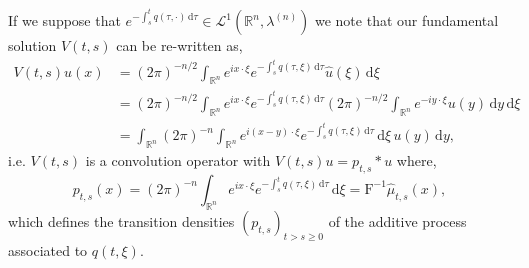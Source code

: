 \documentclass[a4paper, 12pt]{report}
\theoremstyle{remark}
\theoremstyle{definition}
\begin{document}
If we suppose that $e^{-\int_s^tq(\tau, \cdot)\,\mathrm{d}\tau} \in \mathcal{L}^1(\mathbb{R}^n, \lambda^{(n)})$ we note that our fundamental solution $V(t, s)$ can be re-written as,
\begin{align}
V(t, s)u(x) & = (2\pi)^{-n/2}\int_{\mathbb{R}^n}e^{ix\cdot\xi}e^{-\int_s^tq(\tau, \xi)\,\mathrm{d}\tau}\hat{u}(\xi)\,\mathrm{d}\xi\nonumber\\
& = (2\pi)^{-n/2}\int_{\mathbb{R}^n}e^{ix\cdot\xi}e^{-\int_s^tq(\tau, \xi)\,\mathrm{d}\tau}(2\pi)^{-n/2}\int_{\mathbb{R}^n}e^{-iy\cdot\xi}u(y)\,\mathrm{d}y\,\mathrm{d}\xi\nonumber\\
& = \int_{\mathbb{R}^n}(2\pi)^{-n}\int_{\mathbb{R}^n}e^{i(x - y)\cdot\xi}e^{-\int_s^tq(\tau, \xi)\,\mathrm{d}\tau}\,\mathrm{d}\xi\,u(y)\,\mathrm{d}y,\nonumber
\end{align}
i.e. $V(t, s)$ is a convolution operator with $V(t, s)u = p_{t, s} \ast u$ where,
\begin{equation}
p_{t, s}(x) = (2\pi)^{-n}\int_{\mathbb{R}^n}e^{ix\cdot\xi}e^{-\int_s^tq(\tau, \xi)\,\mathrm{d}\tau}\,\mathrm{d}\xi = \mathrm{F}^{-1}\hat{\mu}_{t, s}(x)\label{TD},
\end{equation}
which defines the transition densities $(p_{t, s})_{t > s \ge 0}$ of the additive process associated to $q(t, \xi)$.
\end{document}
